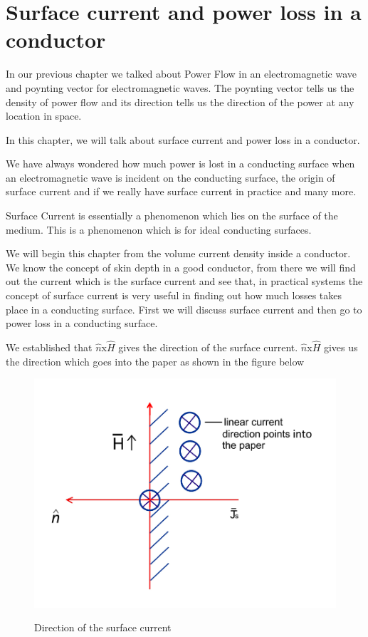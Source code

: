 \chapter{Surface current and power loss in a conductor}\label{lec:lec28}
In our previous chapter we talked about Power Flow in an electromagnetic wave and poynting vector for electromagnetic waves. The poynting vector tells us the density of power flow and its direction tells us the direction of the power at any location in space.

In this chapter, we will talk about surface current and power loss in a conductor.

We have always wondered how much power is lost in a conducting surface when an electromagnetic wave is incident on the conducting surface, the origin of surface current and if we really have surface current in practice and many more.

Surface Current is essentially a phenomenon which lies on the surface of the medium. This is a phenomenon which is for ideal conducting surfaces.

We will begin this chapter from the volume current density inside a conductor. We know the concept of skin depth in a good conductor, from there we will find out the current which is the surface current and see that, in practical systems the concept of surface current is very useful in finding out how much losses takes place in a conducting surface. First we will discuss surface current and then go to power loss in a conducting surface.

We established that $\hat{n}$x$\hat{H}$ gives the direction of the surface current. $\hat{n}$x$\hat{H}$ gives us the direction which goes into the paper as shown in the figure below
\begin{figure}[h]
\centering
\textsc{\includegraphics[width=1\linewidth]{./graphics/surface_current_direction}}
\caption{Direction of the surface current }
\end{figure}

